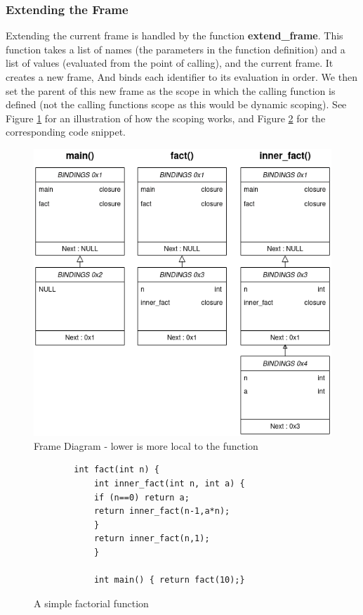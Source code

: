 \documentclass[12pt]{article}
\begin{document}
 \subsubsection{Extending the Frame}
 Extending the current frame is handled by the function \textbf{extend\_frame}. This function takes a list of names (the parameters in the function definition) and a list of values (evaluated from the point of calling), and the current frame. It creates a new frame, And binds each identifier to its evaluation in order. We then set the parent of this new frame as the scope in which the calling function is defined (not the calling functions scope as this would be dynamic scoping). See Figure \ref{framdia} for an illustration of how the scoping works, and Figure \ref{codefordia} for the corresponding code snippet.
 \begin{figure}[H]
    \centering
     \includegraphics[scale=0.5]{1.png}
     \caption{Frame Diagram - lower is more local to the function}
     \label{framdia}
 \end{figure}
 \begin{figure}[H]
     \begin{verbatim}
        int fact(int n) {
            int inner_fact(int n, int a) {
            if (n==0) return a;
            return inner_fact(n-1,a*n);
            }
            return inner_fact(n,1);
            }
           
            int main() { return fact(10);}
     \end{verbatim}
     \caption{A simple factorial function}
     \label{codefordia}
 \end{figure}
\end{document}
